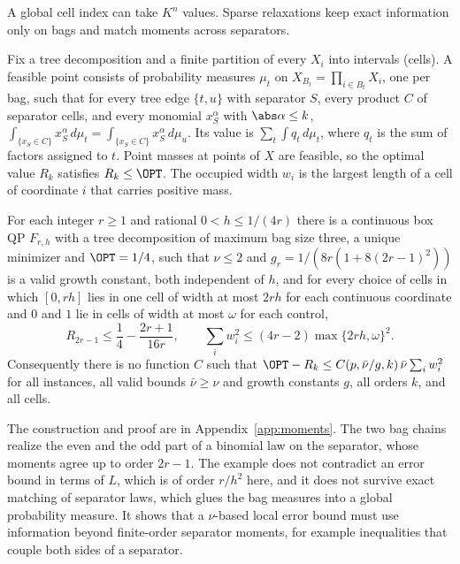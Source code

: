 A global cell index can take $K^n$ values. Sparse relaxations keep exact
information only on bags and match moments across separators.

\begin{definition}\label{lim:def:moments}
Fix a tree decomposition and a finite partition of every $X_i$ into intervals
(cells). A feasible point consists of probability measures $\mu_t$ on
$X_{B_t}=\prod_{i\in B_t}X_i$, one per bag, such that for every tree edge
$\{t,u\}$ with separator $S$, every product $C$ of separator cells, and every
monomial $x_S^\alpha$ with $\abs\alpha\le k$,
$\int_{\{x_S\in C\}}x_S^\alpha\,d\mu_t=\int_{\{x_S\in C\}}x_S^\alpha\,d\mu_u$.
Its value is $\sum_t\int q_t\,d\mu_t$, where $q_t$ is the sum of factors
assigned to $t$. Point masses at points of $X$ are feasible, so the optimal
value $R_k$ satisfies $R_k\le\OPT$. The occupied width $w_i$ is the largest
length of a cell of coordinate $i$ that carries positive mass.
\end{definition}

\begin{proposition}\label{lim:prop:moments}
For each integer $r\ge1$ and rational $0<h\le1/(4r)$ there is a continuous box
QP $F_{r,h}$ with a tree decomposition of maximum bag size three, a unique
minimizer and $\OPT=1/4$, such that $\nu\le2$ and
$g_r=1/(8r(1+8(2r-1)^2))$ is a valid growth constant, both independent of $h$,
and for every choice of cells in which $[0,rh]$ lies in one cell of width at
most $2rh$ for each continuous coordinate and $0$ and $1$ lie in cells of width
at most $\omega$ for each control,
\[
R_{2r-1}\le\frac14-\frac{2r+1}{16r},\qquad
\sum_iw_i^2\le(4r-2)\max\{2rh,\omega\}^2 .
\]
Consequently there is no function $C$ such that
$\OPT-R_k\le C(p,\bar\nu/g,k)\,\bar\nu\sum_iw_i^2$ for all instances, all
valid bounds $\bar\nu\ge\nu$ and growth constants $g$, all orders $k$, and all
cells.
\end{proposition}

The construction and proof are in Appendix~\ref{app:moments}. The two bag
chains realize the even and the odd part of a binomial law on the separator,
whose moments agree up to order $2r-1$. The example does not contradict an
error bound in terms of $L$, which is of order $r/h^2$ here, and it does not
survive exact matching of separator laws, which glues the bag measures into a
global probability measure. It shows that a $\nu$-based local error bound must
use information beyond finite-order separator moments, for example
inequalities that couple both sides of a separator.
